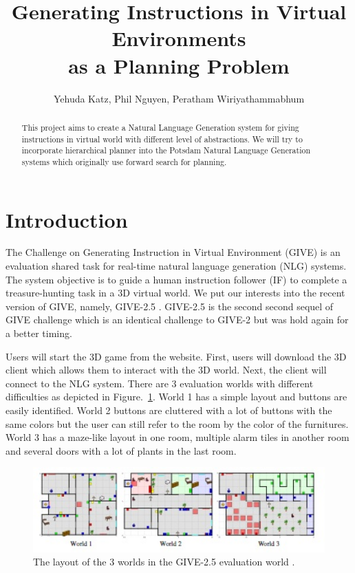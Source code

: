 \documentclass[11pt]{article} %
\title{Generating Instructions in Virtual Environments\\ as a Planning Problem}
\author{Yehuda Katz, Phil Nguyen, Peratham Wiriyathammabhum}
\begin{document}
\maketitle

\begin{abstract}
This project aims to create a Natural Language Generation system
for giving instructions in virtual world with different level of abstractions.
We will try to incorporate hierarchical planner into the Potsdam Natural Language Generation systems
which originally use forward search for planning.
\end{abstract}

\section{Introduction}
The Challenge on Generating Instruction in Virtual Environment (GIVE) \cite{koller2010first}
is an evaluation shared task for real-time natural language generation (NLG) systems.
The system objective is to guide a human instruction follower (IF) to complete a treasure-hunting task
in a 3D virtual world.
We put our interests into the recent version of GIVE, namely, GIVE-2.5 \cite{striegnitz2011report}.
GIVE-2.5 is the second second sequel of GIVE challenge which is an identical challenge
to GIVE-2 \cite{koller2010report} but was hold again for a better timing.

Users will start the 3D game from the website.
First, users will download the 3D client which allows them to interact with the 3D world.
Next, the client will connect to the NLG system.
There are 3 evaluation worlds with different difficulties as depicted in Figure.~\ref{fig:layout}.
World 1 has a simple layout and buttons are easily identified.
World 2 buttons are cluttered with a lot of buttons with the same colors but the user can still refer
to the room by the color of the furnitures.
World 3 has a maze-like layout in one room, multiple alarm tiles in another room
and several doors with a lot of plants in the last room.

\begin{figure}[hbt!]
\centering
\includegraphics[width=120mm]{images/layout.jpg}
\caption{The layout of the 3 worlds in the GIVE-2.5 evaluation world \cite{striegnitz2011report}.\label{overflow}}
\label{fig:layout}
\end{figure}
\end{document}
